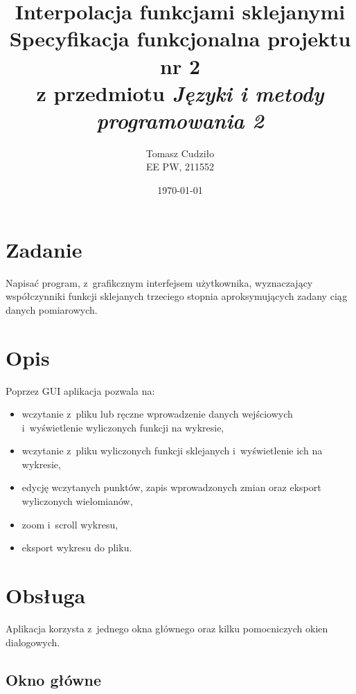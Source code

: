 \documentclass[10pt,a4paper]{article}
\begin{document}
\title{ 
  Interpolacja funkcjami sklejanymi\\
  {\normalsize Specyfikacja funkcjonalna projektu nr 2}\\\vspace{-12pt}
  {\normalsize z przedmiotu \emph{Języki i metody programowania 2}}
}
\author{
  Tomasz Cudziło\\
  {\small EE PW, 211552}
}
\date{\today}
\maketitle

\section*{Zadanie}
\label{sec:zadanie}

Napisać program, z~grafikcznym interfejsem użytkownika, wyznaczający
współczynniki funkcji sklejanych trzeciego stopnia aproksymujących zadany ciąg
danych pomiarowych.

\vspace{24pt}

\section{Opis}
\label{sec:opis}

Poprzez GUI aplikacja pozwala na:
\begin{itemize}
  \item wczytanie z~pliku lub ręczne wprowadzenie danych wejściowych
    i~wyświetlenie wyliczonych funkcji na wykresie,
  \item wczytanie z~pliku wyliczonych funkcji sklejanych i~wyświetlenie ich na
    wykresie,
  \item edycję wczytanych punktów, zapis wprowadzonych zmian oraz eksport
    wyliczonych wielomianów,
  \item zoom i~scroll wykresu,
  \item eksport wykresu do pliku.
\end{itemize}

\section{Obsługa}
\label{sec:obsluga}

Aplikacja korzysta z~jednego okna głównego oraz kilku pomocniczych okien
dialogowych.

\subsection{Okno główne}
\end{document}

